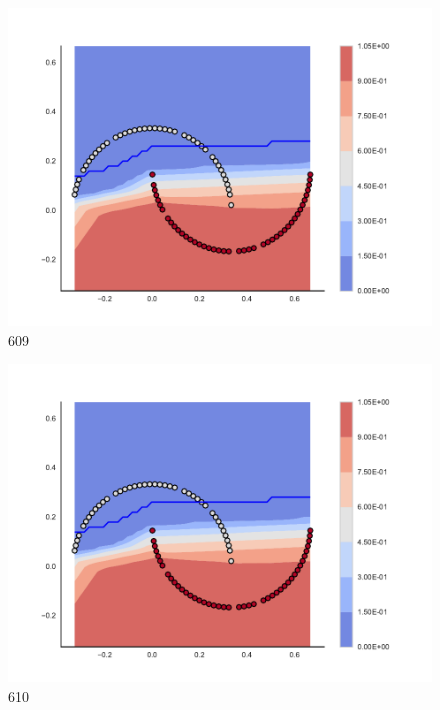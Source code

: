 \begin{subfigure}[b]{0.09\textwidth}
    \includegraphics[clip, trim=2.35cm 1.75cm 4.5cm 0cm,width=\textwidth]{img/convergence/609.pdf}
    \caption{609}
    \label{fig:convergence_609}
\end{subfigure}
%
\begin{subfigure}[b]{0.09\textwidth}
    \includegraphics[clip, trim=2.35cm 1.75cm 4.5cm 0cm,width=\textwidth]{img/convergence/610.pdf}
    \caption{610}
    \label{fig:convergence_610}
\end{subfigure}
%
